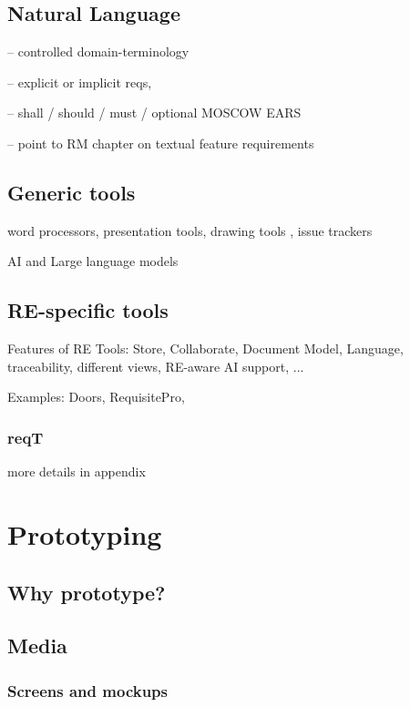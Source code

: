 \documentclass{reqengbook}
\begin{document}
\section{Natural Language}

-- controlled domain-terminology 

-- explicit or implicit reqs, 

-- shall / should / must / optional MOSCOW EARS

-- point to RM chapter on textual feature requirements

\section{Generic tools}
  word processors, presentation tools, drawing tools , issue trackers 

  AI and Large language models 

\section{RE-specific tools}
  Features of RE Tools: Store, Collaborate, Document Model, Language, traceability, different views, RE-aware AI support, ...

  Examples: Doors, RequisitePro, 

\subsection{reqT}

more details in appendix





\chapter{Prototyping}

\section{Why prototype?}

\section{Media}

\subsection{Screens and mockups}
\end{document}

